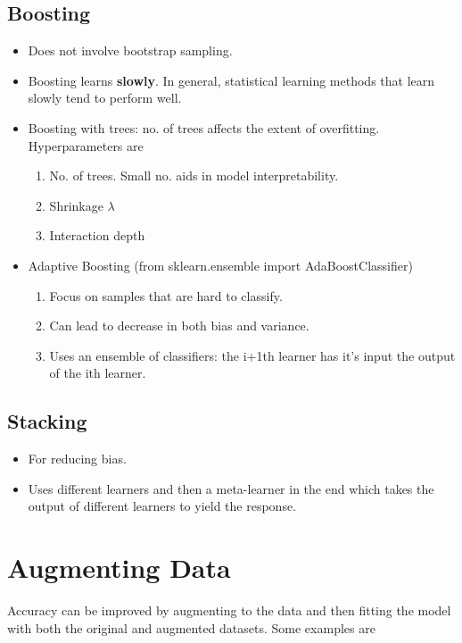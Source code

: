 \documentclass[a4paper, 12pt]{report}
\begin{document}
\subsection{Boosting}
\label{subsec:boosting}
\begin{itemize}
\item Does not involve bootstrap sampling.
\item Boosting learns \textbf{slowly}. In general, statistical learning methods that learn slowly tend to perform well.
\item Boosting with trees: no. of trees affects the extent of overfitting. Hyperparameters are
\begin{enumerate}
\item No. of trees. Small no. aids in model interpretability.
\item Shrinkage $\lambda$
\item Interaction depth
\end{enumerate}
\item Adaptive Boosting ({\color{cyan}from sklearn.ensemble import AdaBoostClassifier})
\begin{enumerate}
\item Focus on samples that are hard to classify.
\item Can lead to decrease in both bias and variance.
\item Uses an ensemble of classifiers: the i+1th learner has it's input the output of the ith learner.
\end{enumerate}
\end{itemize}

\subsection{Stacking}
\begin{itemize}
\item For reducing bias.
\item Uses different learners and then a meta-learner in the end which takes the output of different learners to  yield the response.
\end{itemize}

\section{Augmenting Data}
\label{sec:augmentdata}
Accuracy can be improved by augmenting to the data and then fitting the model with both the original and augmented datasets. Some examples are
\end{document}
